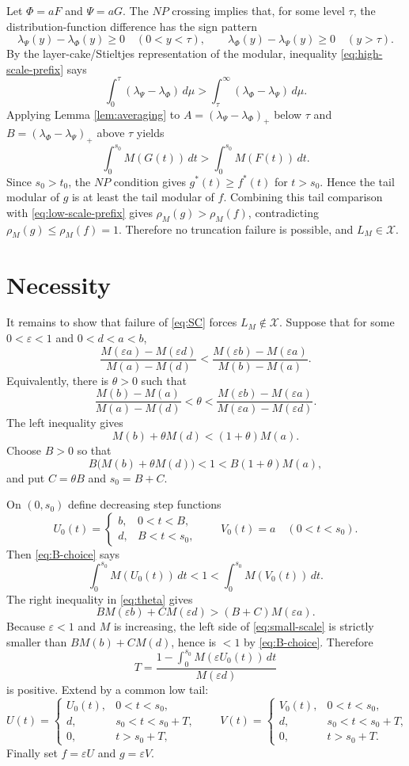 \documentclass[11pt]{article}
\newcommand{\Xclass}{\mathcal X}
\newcommand{\rhoM}{\rho_M}
\newcommand{\eps}{\varepsilon}
\begin{document}
Let $\Phi=aF$ and $\Psi=aG$. The $NP$ crossing implies that, for some level
$\tau$, the distribution-function difference has the sign pattern
\[
 \lambda_\Psi(y)-\lambda_\Phi(y)\ge0\quad (0<y<\tau),\qquad
 \lambda_\Phi(y)-\lambda_\Psi(y)\ge0\quad (y>\tau).
\]
By the layer-cake/Stieltjes representation of the modular, inequality
\eqref{eq:high-scale-prefix} says
\[
 \int_0^\tau (\lambda_\Psi-\lambda_\Phi)\,d\mu
 >
 \int_\tau^\infty (\lambda_\Phi-\lambda_\Psi)\,d\mu .
\]
Applying Lemma \ref{lem:averaging} to
$A=(\lambda_\Psi-\lambda_\Phi)_+$ below $\tau$ and
$B=(\lambda_\Phi-\lambda_\Psi)_+$ above $\tau$ yields
\[
 \int_0^{s_0} M(G(t))\,dt>
 \int_0^{s_0} M(F(t))\,dt .
\tag{3}
\label{eq:low-scale-prefix}
\]
Since $s_0>t_0$, the $NP$ condition gives $g^*(t)\ge f^*(t)$ for
$t>s_0$. Hence the tail modular of $g$ is at least the tail modular of $f$.
Combining this tail comparison with \eqref{eq:low-scale-prefix} gives
$\rhoM(g)>\rhoM(f)$, contradicting $\rhoM(g)\le\rhoM(f)=1$. Therefore no
truncation failure is possible, and $L_M\in\Xclass$.

\section*{Necessity}

It remains to show that failure of \eqref{eq:SC} forces
$L_M\notin\Xclass$. Suppose that for some $0<\eps<1$ and $0<d<a<b$,
\[
\frac{M(\eps a)-M(\eps d)}{M(a)-M(d)}
<
\frac{M(\eps b)-M(\eps a)}{M(b)-M(a)}.
\tag{4}
\label{eq:bad-secant}
\]
Equivalently, there is $\theta>0$ such that
\[
 \frac{M(b)-M(a)}{M(a)-M(d)}
 < \theta <
 \frac{M(\eps b)-M(\eps a)}
      {M(\eps a)-M(\eps d)} .
\tag{5}
\label{eq:theta}
\]
The left inequality gives
\[
 M(b)+\theta M(d)<(1+\theta)M(a).
\tag{6}
\label{eq:large-scale}
\]
Choose $B>0$ so that
\[
 B\bigl(M(b)+\theta M(d)\bigr)<1
 <B(1+\theta)M(a),
\tag{7}
\label{eq:B-choice}
\]
and put $C=\theta B$ and $s_0=B+C$.

On $(0,s_0)$ define decreasing step functions
\[
 U_0(t)=
 \begin{cases}
 b,&0<t<B,\\
 d,&B<t<s_0,
 \end{cases}
 \qquad
 V_0(t)=a\quad(0<t<s_0).
\]
Then \eqref{eq:B-choice} says
\[
 \int_0^{s_0}M(U_0(t))\,dt<1<
 \int_0^{s_0}M(V_0(t))\,dt.
\tag{8}
\label{eq:prefix-large}
\]
The right inequality in \eqref{eq:theta} gives
\[
 B M(\eps b)+C M(\eps d)
 >(B+C)M(\eps a).
\tag{9}
\label{eq:small-scale}
\]
Because $\eps<1$ and $M$ is increasing, the left side of
\eqref{eq:small-scale} is strictly smaller than
$B M(b)+C M(d)$, hence is $<1$ by \eqref{eq:B-choice}. Therefore
\[
 T=\frac{1-\int_0^{s_0}M(\eps U_0(t))\,dt}{M(\eps d)}
\]
is positive. Extend by a common low tail:
\[
 U(t)=
 \begin{cases}
 U_0(t),&0<t<s_0,\\
 d,&s_0<t<s_0+T,\\
 0,&t>s_0+T,
 \end{cases}
 \qquad
 V(t)=
 \begin{cases}
 V_0(t),&0<t<s_0,\\
 d,&s_0<t<s_0+T,\\
 0,&t>s_0+T.
 \end{cases}
\]
Finally set $f=\eps U$ and $g=\eps V$.
\end{document}

